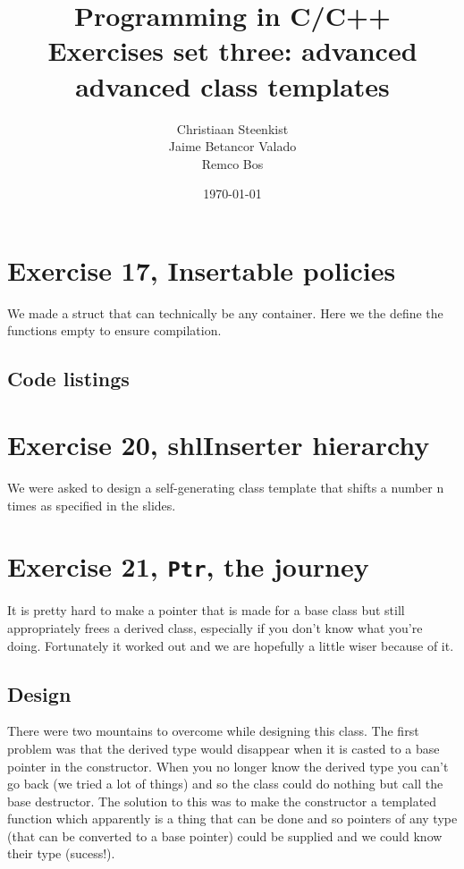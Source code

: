 \documentclass[11pt]{article}
\begin{document}
\title{Programming in C/C++ \\
       Exercises set three: advanced advanced class templates
}
\date{\today}
\author{Christiaan Steenkist \\
Jaime Betancor Valado \\
Remco Bos \\
}

\maketitle
\section*{Exercise 17, Insertable policies}
We made a struct that can technically be any container.
Here we the define the functions empty to ensure compilation.

\subsection*{Code listings}




\section*{Exercise 20, shlInserter hierarchy}
We were asked to design a self-generating class template that shifts a number n times as specified in the slides.




\section*{Exercise 21, \texttt{Ptr}, the journey}
It is pretty hard to make a pointer that is made for a base class but still appropriately frees a derived class, especially if you don't know what you're doing. Fortunately it worked out and we are hopefully a little wiser because of it.

\subsection*{Design}
There were two mountains to overcome while designing this class.
The first problem was that the derived type would disappear when it is casted to a base pointer in the constructor.
When you no longer know the derived type you can't go back (we tried a lot of things) and so the class could do nothing but call the base destructor.
The solution to this was to make the constructor a templated function which apparently is a thing that can be done and so pointers of any type (that can be converted to a base pointer) could be supplied and we could know their type (sucess!).
\end{document}
